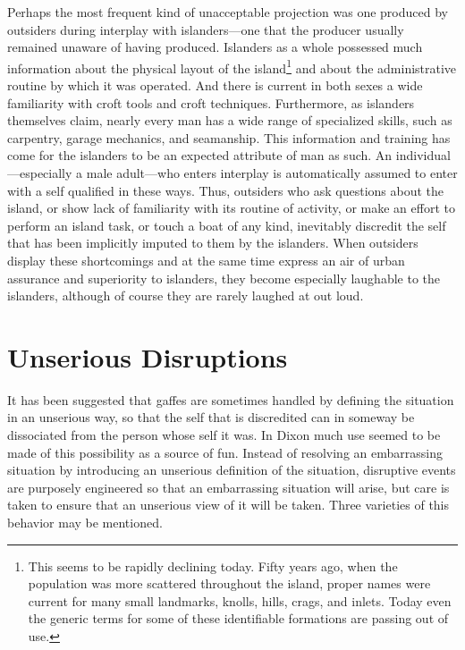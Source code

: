 \documentclass[openany,nobib]{tufte-book}
\begin{document}
Perhaps the most frequent kind of unacceptable projection was one
produced by outsiders during interplay with islanders---one that the
producer usually remained unaware of having produced. Islanders as a
whole possessed much information about the physical layout of the
island\footnote{This seems to be rapidly declining today. Fifty years
  ago, when the population was more scattered throughout the island,
  proper names were current for many small landmarks, knolls, hills,
  crags, and inlets. Today even the generic terms for some of these
  identifiable formations are passing out of use.} and about the
administrative routine by which it was operated. And there is current in
both sexes a wide familiarity with croft tools and croft techniques.
Furthermore, as islanders themselves claim, nearly every man has a wide
range of specialized skills, such as carpentry, garage mechanics, and
seamanship. This information and training has come for the islanders to
be an expected attribute of man as such. An individual---especially a
male adult---who enters interplay is automatically assumed to enter with
a self qualified in these ways. Thus, outsiders who ask questions about
the island, or show lack of familiarity with its routine of activity, or
make an effort to perform an island task, or touch a boat of any kind,
inevitably discredit the self that has been implicitly imputed to them
by the islanders. When outsiders display these shortcomings and at the
same time express an air of urban assurance and superiority to
islanders, they become especially laughable to the islanders, although
of course they are rarely laughed at out loud.

\hypertarget{unserious-disruptions}{%
\section{Unserious Disruptions}\label{unserious-disruptions}}

It has been suggested that gaffes are sometimes handled by defining the
situation in an unserious way, so that the self that is discredited can
in someway be dissociated from the person whose self it was. In Dixon
much use seemed to be made of this possibility as a source of fun.
Instead of resolving an embarrassing situation by introducing an
unserious definition of the situation, disruptive events are purposely
engineered so that an embarrassing situation will arise, but care is
taken to ensure that an unserious view of it will be taken. Three
varieties of this behavior may be mentioned.
\end{document}
